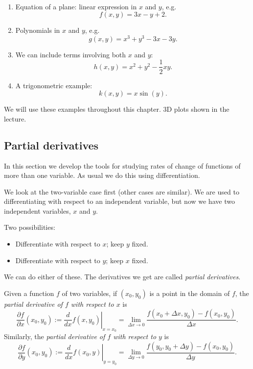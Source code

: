   \begin{examples}
  \
    \begin{enumerate}[topsep=0pt]
      \item Equation of a plane: linear expression in $x$ and $y$, e.g.
        \[
          f(x, y) = 3x - y + 2.
        \]
      \item Polynomials in $x$ and $y$, e.g.
        \[
          g(x, y) = x^3 + y^3 - 3x - 3y.
        \]
      \item We can include terms involving both $x$ and $y$:
        \[
          h(x, y) = x^2 + y^2 - \frac{1}{2}xy.
        \]
      \item A trigonometric example:
        \[
          k(x, y) = x\sin(y).
        \]
    \end{enumerate}
  \end{examples}

  We will use these examples throughout this chapter.  3D plots shown in the lecture.


\subsection{Partial derivatives}

  In this section we develop the tools for studying rates of change of functions of more than one variable.  As usual we do this using differentiation.

  We look at the two-variable case first (other cases are similar).  We are used to differentiating with respect to an independent variable, but now we have two independent variables, $x$ and $y$.

  Two possibilities:
    \begin{itemize}[topsep=0pt]
      \item Differentiate with respect to $x$; keep $y$ fixed.
      \item Differentiate with respect to $y$; keep $x$ fixed.
    \end{itemize}

  We can do either of these.  The derivatives we get are called \emph{partial derivatives}.

  \begin{definition}
    Given a function $f$ of two variables, if $(x_0, y_0)$ is a point in the domain of $f$, the \emph{partial derivative of $f$ with respect to $x$} is
    \[
      \frac{\partial f}{\partial x}(x_0, y_0) := \left. \frac{d}{dx}f(x, y_0) \right|_{x = x_0} = \lim_{\Delta x \rightarrow 0} \frac{f(x_0 + \Delta x, y_0) - f(x_0, y_0)}{\Delta x}.
    \]
    Similarly, the \emph{partial derivative of $f$ with respect to $y$} is
    \[
      \frac{\partial f}{\partial y}(x_0, y_0) := \left. \frac{d}{dx}f(x_0, y) \right|_{y = y_0} = \lim_{\Delta y \rightarrow 0} \frac{f(y_0, y_0 + \Delta y) - f(x_0, y_0)}{\Delta y}.
    \]
  \end{definition}

